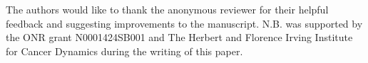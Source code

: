 

The authors would like to thank the anonymous reviewer for their helpful feedback and suggesting improvements to the manuscript. N.B. was supported by the ONR grant N0001424SB001 and The Herbert and Florence Irving Institute for Cancer Dynamics during the writing of this paper.